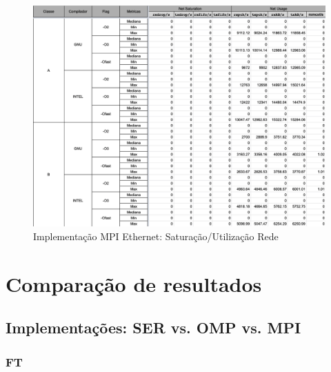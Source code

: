 \documentclass{article}
\begin{document}
\begin{appendices}
\begin{figure}[H]
    \centering
    \includegraphics[width=12cm]{Pictures/LUMZ_r431_MPIE_NET.png}
    \caption{Implementação MPI Ethernet: Saturação/Utilização Rede}
    \label{figure:LUMZ_r431_MPIE_NET}
\end{figure}

\section{Comparação de resultados}
\subsection{Implementações: SER vs. OMP vs. MPI}

\subsubsection{FT}


\end{appendices}
\end{document}
